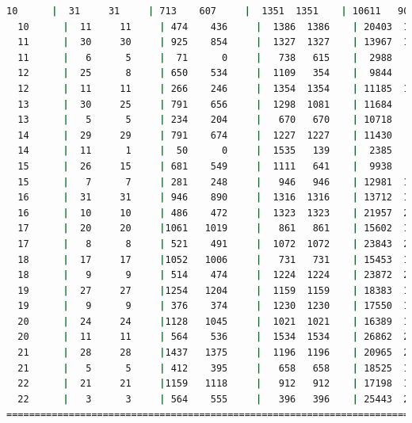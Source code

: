 \begin{lstlisting}[language=bash,basicstyle=\ttfamily\scriptsize]
  10      |  31     31     | 713    607     |  1351  1351    | 10611   9032   |  45     71
  10      |  11     11     | 474    436     |  1386  1386    | 20403  18766   |  42     69
  11      |  30     30     | 925    854     |  1327  1327    | 13967  12897   |  33     71
  11      |   6      5     |  71      0     |   738   615    |  2988      0   |  37     70
  12      |  25      8     | 650    534     |  1109   354    |  9844   8088   |  40     68
  12      |  11     11     | 266    246     |  1354  1354    | 11185  10343   |  48     71
  13      |  30     25     | 791    656     |  1298  1081    | 11684   9691   |  27     71
  13      |   5      5     | 234    204     |   670   670    | 10718   9343   |  12     70
  14      |  29     29     | 791    674     |  1227  1227    | 11430   9740   |  29     69
  14      |  11      1     |  50      0     |  1535   139    |  2385      0   |  46     70
  15      |  26     15     | 681    549     |  1111   641    |  9938   8012   |  36     72
  15      |   7      7     | 281    248     |   946   946    | 12981  11455   |  24     72
  16      |  31     31     | 946    890     |  1316  1316    | 13712  12902   |  29     77
  16      |  10     10     | 486    472     |  1323  1323    | 21957  21324   |  32     75
  17      |  20     20     |1061   1019     |   861   861    | 15602  14984   |  35     71
  17      |   8      8     | 521    491     |  1072  1072    | 23843  22468   |  28     73
  18      |  17     17     |1052   1006     |   731   731    | 15453  14773   |  27     75
  18      |   9      9     | 514    474     |  1224  1224    | 23872  22022   |  49     74
  19      |  27     27     |1254   1204     |  1159  1159    | 18383  17649   |  48     73
  19      |   9      9     | 376    374     |  1230  1230    | 17550  17457   |  37     75
  20      |  24     24     |1128   1045     |  1021  1021    | 16389  15182   |  20     72
  20      |  11     11     | 564    536     |  1534  1534    | 26862  25526   |  38     73
  21      |  28     28     |1437   1375     |  1196  1196    | 20965  20060   |  31     75
  21      |   5      5     | 412    395     |   658   658    | 18525  17759   |  52     74
  22      |  21     21     |1159   1118     |   912   912    | 17198  16595   |  29     79
  22      |   3      3     | 564    555     |   396   396    | 25443  25047   |  36     78
============================================================================================
\end{lstlisting}

